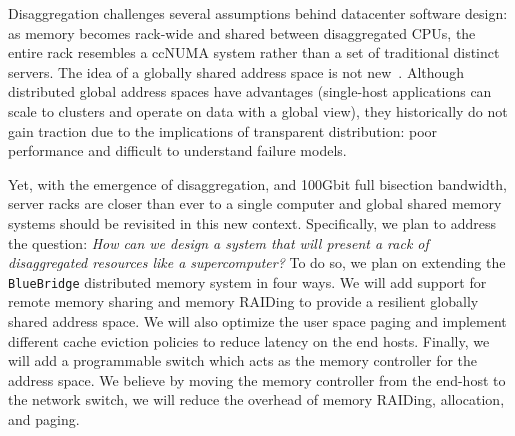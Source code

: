Disaggregation challenges several assumptions behind datacenter software
design: as memory becomes rack-wide and shared between disaggregated CPUs, the
entire rack resembles a ccNUMA system rather than a set of traditional
distinct servers. 
The idea of a globally shared address space is not new~\cite{Nelson2015,Keleher1994}.
Although distributed global address spaces have advantages (single-host
applications can scale to clusters and operate on data with a global view),
they historically do not gain traction due to the implications of transparent
distribution: poor performance and difficult to understand failure models. 


Yet, with the emergence of disaggregation, and 100Gbit full bisection
bandwidth, server racks are closer than ever to a single computer and
global shared memory systems should be revisited in this new context.
Specifically, we plan to address the question: \emph{How can we design
a system that will present a rack of disaggregated resources like a
supercomputer?} To do so, we plan on extending the \texttt{BlueBridge}
distributed memory system in four ways. We will add support for remote
memory sharing and memory RAIDing to provide a resilient globally
shared address space. We will also optimize the user space paging and
implement different cache eviction policies to reduce latency on the
end hosts. Finally, we will add a programmable switch which acts as
the memory controller for the address space. We believe by moving the
memory controller from the end-host to the network switch, we will
reduce the overhead of memory RAIDing, allocation, and paging.


